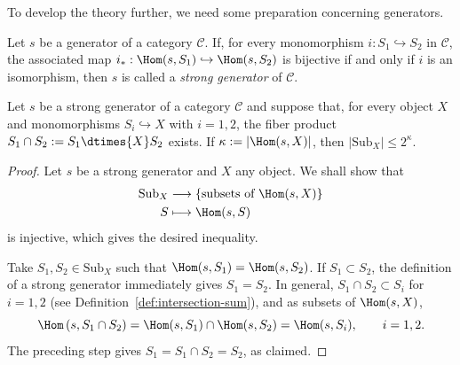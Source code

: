 To develop the theory further, we need some preparation concerning generators.

\begin{definition}
Let $s$ be a generator of a category $\mathcal{C}$. If, for every
monomorphism $i:S_1\hookrightarrow S_2$ in $\mathcal{C}$, the associated map
$i_*:\Hom(s,S_1)\hookrightarrow\Hom(s,S_2)$ is bijective if and only if $i$
is an isomorphism, then $s$ is called a \emph{strong generator} of
$\mathcal{C}$.
\end{definition}

\begin{proposition}\label{prop:strong-generator-well-powered}
Let $s$ be a strong generator of a category $\mathcal{C}$ and suppose that,
for every object $X$ and monomorphisms $S_i\hookrightarrow X$ with $i=1,2$,
the fiber product $S_1\cap S_2:=S_1\dtimes{X}S_2$ exists. If
$\kappa:=|\Hom(s,X)|$, then $|\mathrm{Sub}_X|\leq2^\kappa$.
\end{proposition}
\begin{proof}
Let $s$ be a strong generator and $X$ any object. We shall show that
\begin{align*}
	\mathrm{Sub}_X&\longrightarrow
	\left\{\text{subsets of }\Hom(s,X)\right\}\\
	S&\longmapsto\Hom(s,S)
\end{align*}
is injective, which gives the desired inequality.

Take $S_1,S_2\in\mathrm{Sub}_X$ such that
$\Hom(s,S_1)=\Hom(s,S_2)$. If $S_1\subset S_2$, the definition of a strong
generator immediately gives $S_1=S_2$. In general,
$S_1\cap S_2\subset S_i$ for $i=1,2$ (see
Definition~\ref{def:intersection-sum}), and as subsets of $\Hom(s,X)$,
\[\Hom\left(s,S_1\cap S_2\right)
=\Hom(s,S_1)\cap\Hom(s,S_2)=\Hom(s,S_i),\qquad i=1,2.\]
The preceding step gives $S_1=S_1\cap S_2=S_2$, as claimed.
\end{proof}

